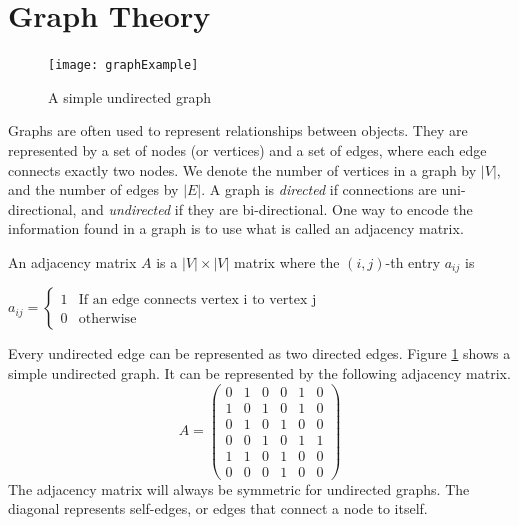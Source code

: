 
\label{lab:ImgSeg_eigenvalues}

\section*{Graph Theory}
\begin{figure}[h]
\texttt{[image: graphExample]}
\caption{A simple undirected graph}
\label{fig:example_graph}
\end{figure}

Graphs are often used to represent relationships between objects.
They are represented by a set of nodes (or vertices) and a set of edges, where each edge connects exactly two nodes.
We denote the number of vertices in a graph by $|V|$, and the number of edges by $|E|$.
A graph is \emph{directed} if connections are uni-directional, and \emph{undirected} if they are bi-directional.
One way to encode the information found in a graph is to use what is called an adjacency matrix.
\begin{definition} An adjacency matrix $A$ is a $|V| \times |V|$ matrix where the $(i,j)$-th entry $a_{ij}$ is
\begin{center}
	$a_{ij} = \begin{cases} 1 & \mbox{If an edge connects vertex i to vertex j} \\ 0 & \mbox{otherwise} \end{cases}$
\end{center}
\end{definition}

Every undirected edge can be represented as two directed edges.
Figure \ref{fig:example_graph} shows a simple undirected graph.
It can be represented by the following adjacency matrix.
\[
A = \begin{pmatrix}
0 & 1 & 0 & 0 & 1 & 0\\
1 & 0 & 1 & 0 & 1 & 0\\
0 & 1 & 0 & 1 & 0 & 0\\
0 & 0 & 1 & 0 & 1 & 1\\
1 & 1 & 0 & 1 & 0 & 0\\
0 & 0 & 0 & 1 & 0 & 0
\end{pmatrix}
\]
The adjacency matrix will always be symmetric for undirected graphs.
The diagonal represents self-edges, or edges that connect a node to itself.

